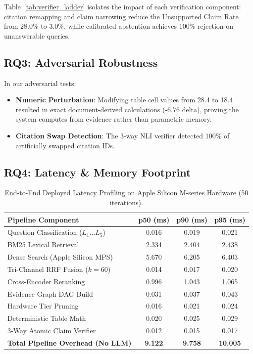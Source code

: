 \documentclass[11pt,a4paper]{article}
\begin{document}
Table~\ref{tab:verifier_ladder} isolates the impact of each verification component: citation remapping and claim narrowing reduce the Unsupported Claim Rate from 28.0\% to 3.0\%, while calibrated abstention achieves 100\% rejection on unanswerable queries.

\subsection{RQ3: Adversarial Robustness}
In our adversarial tests:
\begin{itemize}
    \item \textbf{Numeric Perturbation}: Modifying table cell values from 28.4 to 18.4 resulted in exact document-derived calculations (-6.76 delta), proving the system computes from evidence rather than parametric memory.
    \item \textbf{Citation Swap Detection}: The 3-way NLI verifier detected 100\% of artificially swapped citation IDs.
\end{itemize}

\subsection{RQ4: Latency & Memory Footprint}

\begin{table}[t]
\centering
\small
\begin{tabular}{lccc}
\toprule
\textbf{Pipeline Component} & \textbf{p50 (ms)} & \textbf{p90 (ms)} & \textbf{p95 (ms)} \\
\midrule
Question Classification ($L_1 \dots L_5$) & 0.016 & 0.019 & 0.021 \\
BM25 Lexical Retrieval & 2.334 & 2.404 & 2.438 \\
Dense Search (Apple Silicon MPS) & 5.670 & 6.205 & 6.403 \\
Tri-Channel RRF Fusion ($k=60$) & 0.014 & 0.017 & 0.020 \\
Cross-Encoder Reranking & 0.996 & 1.043 & 1.065 \\
Evidence Graph DAG Build & 0.031 & 0.037 & 0.043 \\
Hardware Tier Pruning & 0.016 & 0.021 & 0.024 \\
Deterministic Table Math & 0.020 & 0.025 & 0.029 \\
3-Way Atomic Claim Verifier & 0.012 & 0.015 & 0.017 \\
\midrule
\textbf{Total Pipeline Overhead (No LLM)} & \textbf{9.122} & \textbf{9.758} & \textbf{10.005} \\
\bottomrule
\end{tabular}
\caption{End-to-End Deployed Latency Profiling on Apple Silicon M-series Hardware (50 iterations).}
\label{tab:latency_breakdown}
\end{table}
\end{document}
